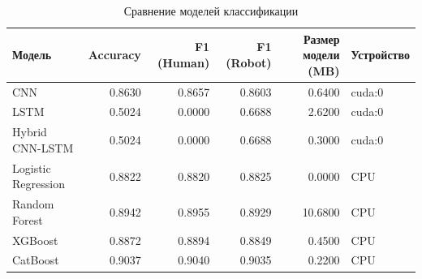 \begin{table}[htbp]
\centering
\caption{Сравнение моделей классификации}
\begin{tabular}{lrrrrl}
\toprule
Модель & Accuracy & F1 (Human) & F1 (Robot) & Размер модели (MB) & Устройство \\
\midrule
CNN & 0.8630 & 0.8657 & 0.8603 & 0.6400 & cuda:0 \\
LSTM & 0.5024 & 0.0000 & 0.6688 & 2.6200 & cuda:0 \\
Hybrid CNN-LSTM & 0.5024 & 0.0000 & 0.6688 & 0.3000 & cuda:0 \\
Logistic Regression & 0.8822 & 0.8820 & 0.8825 & 0.0000 & CPU \\
Random Forest & 0.8942 & 0.8955 & 0.8929 & 10.6800 & CPU \\
XGBoost & 0.8872 & 0.8894 & 0.8849 & 0.4500 & CPU \\
CatBoost & 0.9037 & 0.9040 & 0.9035 & 0.2200 & CPU \\
\bottomrule
\end{tabular}
\label{tab:models_comparison}
\end{table}
